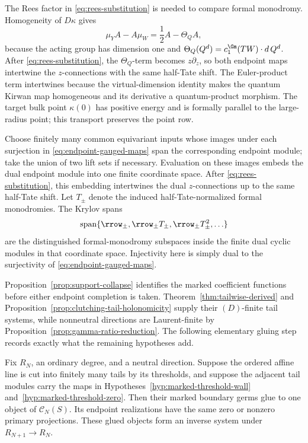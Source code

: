 The Rees factor in \eqref{eq:rees-substitution} is needed to compare formal
monodromy.  Homogeneity
of \(D\kappa\) gives
\begin{equation}\label{eq:rees-homogeneity}
 \mu_YA-A\mu_W=\frac12A-\Theta_QA,
\end{equation}
because the acting group has dimension one and
\(\Theta_Q(Q^d)=c_1^{\Gm}(TW)\cdot d\,Q^d\).  After
\eqref{eq:rees-substitution}, the
\(\Theta_Q\)-term becomes \(z\partial_z\), so both endpoint maps intertwine
the \(z\)-connections with the same half-Tate shift.  The Euler-product term
intertwines because the virtual-dimension identity makes the quantum Kirwan
map homogeneous and its derivative a quantum-product morphism.  The target
bulk point \(\kappa(0)\) has positive energy and is formally parallel to the
large-radius point; this transport preserves the point row.

Choose finitely many common equivariant inputs whose images under each
surjection in \eqref{eq:endpoint-gauged-maps} span the corresponding endpoint
module; take the union
of two lift sets if necessary.  Evaluation on these images embeds the dual
endpoint module into one finite coordinate space.  After
\eqref{eq:rees-substitution}, this
embedding intertwines the dual \(z\)-connections up to the same half-Tate
shift.  Let \(T_\pm\) denote the induced half-Tate-normalized formal
monodromies.  The Krylov spans
\[
 \operatorname{span}\{\rrow_\pm,\rrow_\pm T_\pm,
   \rrow_\pm T_\pm^2,\ldots\}
\]
are the distinguished formal-monodromy subspaces inside the finite dual cyclic
modules in that coordinate space.  Injectivity here is simply dual to the
surjectivity of \eqref{eq:endpoint-gauged-maps}.

Proposition~\ref{prop:support-collapse} identifies the marked coefficient
functions before either endpoint completion is taken.
Theorem~\ref{thm:tailwise-derived} and
Proposition~\ref{prop:clutching-tail-holonomicity} supply their \((D)\)-finite tail
systems, while nonneutral directions are Laurent-finite by
Proposition~\ref{prop:gamma-ratio-reduction}.  The following elementary gluing
step records exactly what the remaining hypotheses add.

\begin{lemma}
\label{lem:finite-threshold-gluing}
Fix \(R_N\), an ordinary degree, and a neutral direction.  Suppose the ordered
affine line is cut into finitely many tails by its thresholds, and suppose the
adjacent tail modules carry the maps in
Hypotheses~\ref{hyp:marked-threshold-wall}
and~\ref{hyp:marked-threshold-zero}.  Then their marked boundary germs glue
to one object of \(\mathcal C_N(S)\).  Its endpoint realizations have the same
zero or nonzero primary projections.  These glued objects form an inverse
system under \(R_{N+1}\to R_N\).
\end{lemma}

